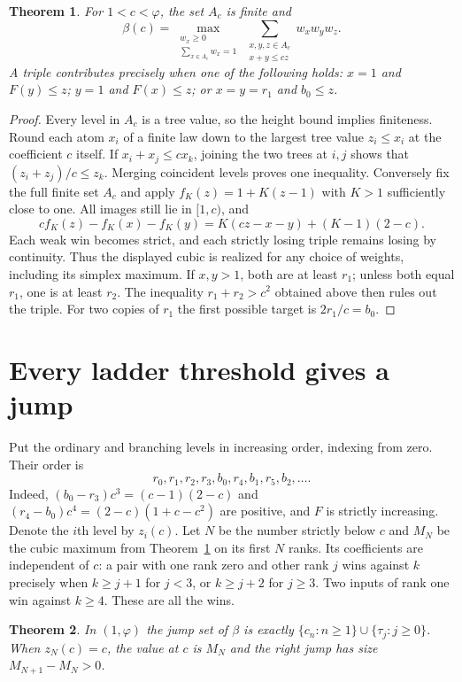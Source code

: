 \documentclass[11pt]{article}
\newtheorem{theorem}{Theorem}
\newcommand{\ph}{\varphi}
\begin{document}
\begin{theorem}\label{th:canonical}
For $1<c<\ph$, the set $A_c$ is finite and
\[
 \beta(c)=\max_{\substack{w_x\ge0\\\sum_{x\in A_c}w_x=1}}
   \sum_{\substack{x,y,z\in A_c\\x+y\le cz}}w_xw_yw_z .
\]
A triple contributes precisely when one of the following holds:
$x=1$ and $F(y)\le z$; $y=1$ and $F(x)\le z$; or
$x=y=r_1$ and $b_0\le z$.
\end{theorem}
\begin{proof}
Every level in $A_c$ is a tree value, so the height bound implies finiteness.
Round each atom $x_i$ of a finite law down to the largest tree value $z_i\le x_i$
at the coefficient $c$ itself. If $x_i+x_j\le cx_k$, joining the two
trees at $i,j$ shows that $(z_i+z_j)/c\le z_k$. Merging coincident
levels proves one inequality. Conversely fix the full finite set $A_c$
and apply $f_K(z)=1+K(z-1)$ with $K>1$ sufficiently close to one. All
images still lie in $[1,c)$, and
\[
 cf_K(z)-f_K(x)-f_K(y)=K(cz-x-y)+(K-1)(2-c).
\]
Each weak win becomes strict, and each strictly losing triple remains
losing by continuity. Thus the displayed cubic is realized for any
choice of weights, including its simplex maximum.
If $x,y>1$, both are at least $r_1$; unless both equal $r_1$,
one is at least $r_2$. The inequality $r_1+r_2>c^2$ obtained above
then rules out the triple. For two copies of $r_1$ the first possible
target is $2r_1/c=b_0$.
\end{proof}

\section{Every ladder threshold gives a jump}
Put the ordinary and branching levels in increasing order, indexing from
zero. Their order is
\[
 r_0,r_1,r_2,r_3,b_0,r_4,b_1,r_5,b_2,\ldots .
\]
Indeed, $(b_0-r_3)c^3=(c-1)(2-c)$ and
$(r_4-b_0)c^4=(2-c)(1+c-c^2)$ are positive, and $F$ is strictly
increasing. Denote the $i$th level by $z_i(c)$. Let $N$ be the
number strictly below $c$ and $M_N$ be the cubic maximum from
Theorem~\ref{th:canonical} on its first $N$ ranks.
Its coefficients are independent of $c$: a pair with one rank zero
and other rank $j$ wins against $k$ precisely when
$k\ge j+1$ for $j<3$, or $k\ge j+2$ for $j\ge3$.
Two inputs of rank one win against $k\ge4$.
These are all the wins.

\begin{theorem}\label{th:location}
In $(1,\ph)$ the jump set of $\beta$ is exactly
$\{c_n:n\ge1\}\cup\{\tau_j:j\ge0\}$.
When $z_N(c)=c$, the value at $c$ is $M_N$ and the right jump has
size $M_{N+1}-M_N>0$.
\end{theorem}
\end{document}
